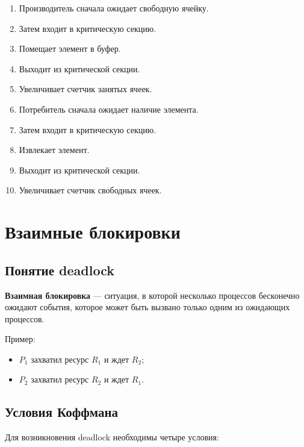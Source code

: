 \documentclass[12pt,a4paper]{article}
\begin{document}
\begin{enumerate}
    \item Производитель сначала ожидает свободную ячейку.
    \item Затем входит в критическую секцию.
    \item Помещает элемент в буфер.
    \item Выходит из критической секции.
    \item Увеличивает счетчик занятых ячеек.
    \item Потребитель сначала ожидает наличие элемента.
    \item Затем входит в критическую секцию.
    \item Извлекает элемент.
    \item Выходит из критической секции.
    \item Увеличивает счетчик свободных ячеек.
\end{enumerate}

\section{Взаимные блокировки}

\subsection{Понятие deadlock}

\textbf{Взаимная блокировка} --- ситуация, в которой несколько процессов бесконечно ожидают события, которое может быть вызвано только одним из ожидающих процессов.

Пример:

\begin{itemize}
    \item $P_1$ захватил ресурс $R_1$ и ждет $R_2$;
    \item $P_2$ захватил ресурс $R_2$ и ждет $R_1$.
\end{itemize}

\subsection{Условия Коффмана}

Для возникновения deadlock необходимы четыре условия:
\end{document}
